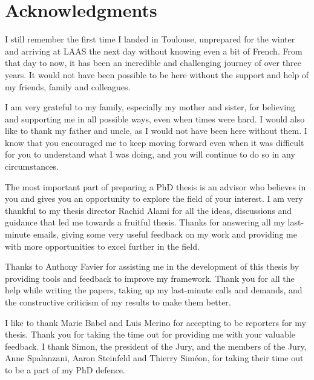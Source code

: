 \documentclass[english,a4paper,11pt,twoside]{StyleThese}
\begin{document}
\makeflyleaf



\cleardoublepage

\dominitoc


\cleardoublepage

\section*{Acknowledgments}
I still remember the first time I landed in Toulouse, unprepared for the winter and arriving at LAAS the next day without knowing even a bit of French. From that day to now, it has been an incredible and challenging journey of over three years. It would not have been possible to be here without the support and help of my friends, family and colleagues. 

I am very grateful to my family, especially my mother and sister, for believing and supporting me in all possible ways, even when times were hard. I would also like to thank my father and uncle, as I would not have been here without them. I know that you encouraged me to keep moving forward even when it was difficult for you to understand what I was doing, and you will continue to do so in any circumstances. 

The most important part of preparing a PhD thesis is an advisor who believes in you and gives you an opportunity to explore the field of your interest. I am very thankful to my thesis director Rachid Alami for all the ideas, discussions and guidance that led me towards a fruitful thesis. Thanks for answering all my last-minute emails, giving some very useful feedback on my work and providing me with more opportunities to excel further in the field.

Thanks to Anthony Favier for assisting me in the development of this thesis by providing tools and feedback to improve my framework. Thank you for all the help while writing the papers, taking up my last-minute calls and demands, and the constructive criticism of my results to make them better. 

I like to thank Marie Babel and Luis Merino for accepting to be reporters for my thesis. Thank you for taking the time out for providing me with your valuable feedback. I thank Simon, the president of the Jury, and the members of the Jury, Anne Spalanzani, Aaron Steinfeld and Thierry Sim\'eon, for taking their time out to be a part of my PhD defence.
\end{document}
